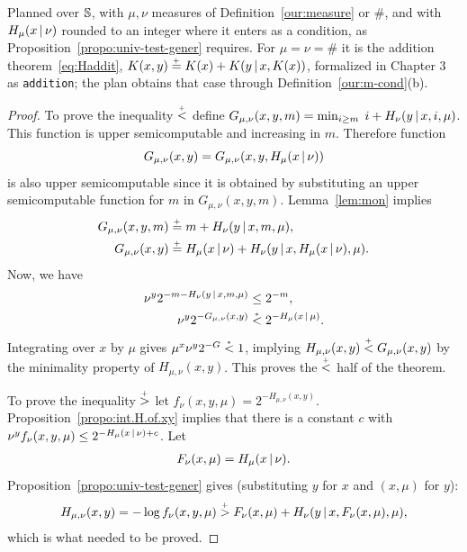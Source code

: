 \begin{formalization}
Planned over $\mathbb{S}$, with $\mu,\nu$ measures of Definition~\ref{our:measure} or $\#$, and with
$H_{\mu}(x \,\vert\, \nu)$ rounded to an integer where it enters as a condition, as
Proposition~\ref{propo:univ-test-gener} requires. For $\mu = \nu = \#$ it is the addition
theorem~\eqref{eq:Haddit}, $K(x,y)\stackrel{{}_+}{=} K(x)+K(y \,\vert\, x,K(x))$, formalized in Chapter 3 as
\texttt{addition}; the plan obtains that case through Definition~\ref{our:m-cond}(b).
\end{formalization}
 \begin{proof}
To prove the inequality $\stackrel{{}_+}{<}$ define
$G_{\mu,\nu}(x,y,m) =\min_{i\ge m}\;i +  H_{\nu}(y \,\vert\, x, i, \mu)$.
This function is upper semicomputable and increasing
in $m$.
Therefore function
  \[
   G_{\mu,\nu}(x,y)  = G_{\mu,\nu}(x, y, H_{\mu}(x \,\vert\, \nu))
  \]
is also upper semicomputable since it is obtained by substituting an
upper semicomputable function for $m$ in $G_{\mu,\nu}(x,y,m)$.
Lemma~\ref{lem:mon} implies 
  \begin{align*}
     G_{\mu,\nu}(x,y,m) &\stackrel{{}_+}{=} m +  H_{\nu}(y \,\vert\, x, m, \mu),
 \\  G_{\mu,\nu}(x,y)   &\stackrel{{}_+}{=} H_{\mu}(x \,\vert\, \nu) + 
    H_{\nu}(y \,\vert\, x, H_{\mu}(x \,\vert\, \nu), \mu).
  \end{align*}
   Now, we have
  \begin{align*}
    \nu^{y} 2^{-m - H_{\nu}(y \,\vert\, x, m, \mu)} &\le 2^{-m},
 \\   \nu^{y} 2^{-G_{\mu,\nu}(x,y)} &\stackrel{{}_*}{<} 2^{-H_{\mu}(x \,\vert\, \mu)}.
  \end{align*}
Integrating over $x$ by $\mu$ gives $\mu^{x}\nu^{y}2^{-G} \stackrel{{}_*}{<} 1$, implying
$H_{\mu,\nu}(x,y) \stackrel{{}_+}{<} G_{\mu,\nu}(x,y)$ 
by the minimality property of $H_{\mu,\nu}(x,y)$.
This proves the $\stackrel{{}_+}{<}$ half of the theorem.

To prove the inequality $\stackrel{{}_+}{>}$ let $f_{\nu}(x,y,\mu) = 2^{-H_{\mu,\nu}(x,y)}$.
Proposition~\ref{propo:int.H.of.xy} implies that there is a constant $c$ with
$\nu^{y} f_{\nu}(x,y,\mu) \le 2^{-H_{\mu}(x \,\vert\, \nu)+c}$.
Let 
 \begin{align*}
  F_{\nu}(x, \mu) = H_{\mu}(x \,\vert\, \nu).
 \end{align*}
Proposition~\ref{propo:univ-test-gener} gives (substituting $y$ for $x$ and
  $(x,\mu)$ for $y$):
 \begin{align*}
  H_{\mu,\nu}(x,y) = -\log f_{\nu}(x,y,\mu) 
   \stackrel{{}_+}{>} F_{\nu}(x,\mu)+ H_{\nu}(y \,\vert\, x,F_{\nu}(x,\mu),\mu),
 \end{align*}
which is what needed to be proved.
 \end{proof}


